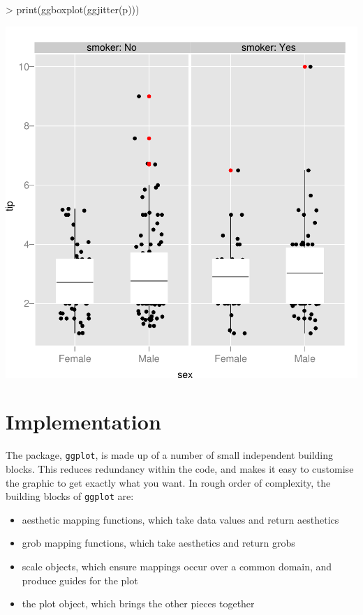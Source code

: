 \documentclass[]{article}
\begin{document}
\begin{Schunk}
\begin{Sinput}
> print(ggboxplot(ggjitter(p)))
\end{Sinput}
\end{Schunk}
\includegraphics{introduction-014}

\section{Implementation}

The package, \texttt{ggplot}, is made up of a number of small independent building blocks.  This reduces redundancy within the code, and makes it easy to customise the graphic to get exactly what you want.  In rough order of complexity, the building blocks of \texttt{ggplot} are:

\begin{itemize}
	\item aesthetic mapping functions, which take data values and return aesthetics
	\item grob mapping functions, which take aesthetics and return grobs
	\item scale objects, which ensure mappings occur over a common domain, and produce guides for the plot
	\item the plot object, which brings the other pieces together
\end{itemize}
\end{document}
